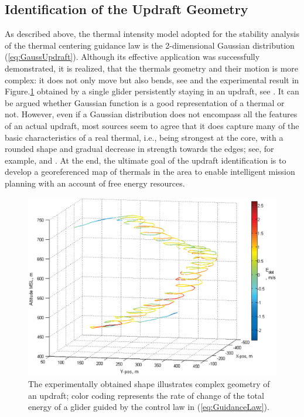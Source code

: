 \documentclass{ifacconf}
\begin{document}
\subsection{Identification of the Updraft Geometry}
\label{subsec:UpdraftID}
As described above, the thermal intensity model adopted for the stability analysis of the thermal centering guidance law is the 2-dimensional Gaussian distribution (\ref{eq:GaussUpdraft}). Although its effective application was successfully demonstrated, it is realized, that the thermals geometry and their motion is more complex: it does not only move but also bends, see \cite{Reichmann:1978} and the experimental result in  Figure.\ref{fig:ThermaShape} obtained by a single glider persistently staying in an updraft, see \cite{AKlass_JGCD:2012}.  It can be argued whether Gaussian function is a good representation of a thermal or not. However, even if a Gaussian distribution does not encompass all the features of an actual updraft, most sources seem to agree that it does capture many of the basic characteristics of a real thermal, i.e., being strongest at the core, with a rounded shape and gradual decrease in strength towards the edges; see, for example, \cite{Wharington:1998} and \cite{Pagen:1992}. At the end, the ultimate goal of the updraft identification is to develop a georeferenced map of thermals in the area to enable intelligent mission planning with an account of free energy resources.

\begin{figure}[thpb]
  \centering
  \includegraphics[scale=0.3]{Figures/BendedThermal.eps}
  \caption{The experimentally obtained shape illustrates complex geometry of an updraft; color coding represents the rate of change of the total energy of a glider guided by the control law in (\ref{eq:GuidanceLaw}).}
  \label{fig:ThermaShape}
\end{figure}
\end{document}
